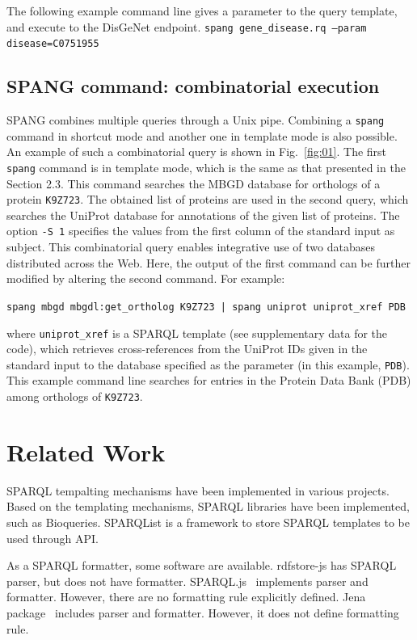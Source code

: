 \documentclass[runningheads]{llncs}
\begin{document}
The following example command line gives a parameter to the query template, and execute to the DisGeNet endpoint.
\texttt{spang gene\_disease.rq --param disease=C0751955}




\subsection{SPANG command: combinatorial execution}

SPANG combines multiple queries through a Unix pipe. 
Combining a {\tt spang} command in shortcut mode and another one in template mode is also possible.
An example of such a combinatorial query is shown in Fig.~\ref{fig:01}.
The first {\tt spang} command is in template mode, which is the same as that presented in the Section 2.3. 
This command searches the MBGD database for orthologs of a protein {\tt K9Z723}. 
The obtained list of proteins are used in the second query, which searches the UniProt database for annotations of the given list of proteins. 
The option \texttt{-S 1} specifies the values from the first column of the standard input as subject.
This combinatorial query enables integrative use of two databases distributed across the Web. 
Here, the output of the first command can be further modified by altering the second command.
For example:
\begin{quoting}
\texttt{spang mbgd mbgdl:get\_ortholog K9Z723 | spang uniprot uniprot\_xref PDB}
\vspace{1pt}
\end{quoting}
where {\tt uniprot\_xref} is a SPARQL template (see supplementary data for the code), which retrieves cross-references from the UniProt IDs given in the standard input to the database specified as the parameter (in this example, {\tt PDB}). This example command line searches for entries in the Protein Data Bank (PDB) \citep{Berman} among orthologs of {\tt K9Z723}.



\section{Related Work}

SPARQL tempalting mechanisms have been implemented in various projects. Based on the templating mechanisms, SPARQL libraries have been implemented, such as Bioqueries. SPARQList is a framework to store SPARQL templates to be used through API.

As a SPARQL formatter, some software are available.
rdfstore-js\cite{rdfstore-js} has SPARQL parser, but does not have formatter.
SPARQL.js~\cite{sparql-js} implements parser and formatter. However, there are no formatting rule explicitly defined.
Jena package~\cite{jena} includes parser and formatter. However, it does not define formatting rule.
\end{document}
